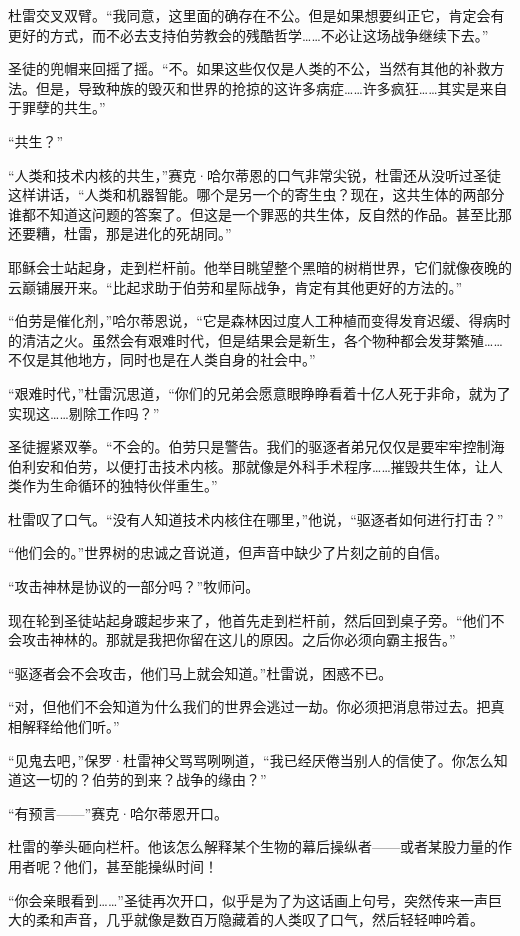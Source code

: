 \documentclass[AutoFakeBold=true]{book}
\begin{document}
杜雷交叉双臂。``我同意，这里面的确存在不公。但是如果想要纠正它，肯定会有更好的方式，而不必去支持伯劳教会的残酷哲学……不必让这场战争继续下去。''

圣徒的兜帽来回摇了摇。``不。如果这些仅仅是人类的不公，当然有其他的补救方法。但是，导致种族的毁灭和世界的抢掠的这许多病症……许多疯狂……其实是来自于罪孽的共生。''

``共生？''

``人类和技术内核的共生，''赛克·哈尔蒂恩的口气非常尖锐，杜雷还从没听过圣徒这样讲话，``人类和机器智能。哪个是另一个的寄生虫？现在，这共生体的两部分谁都不知道这问题的答案了。但这是一个罪恶的共生体，反自然的作品。甚至比那还要糟，杜雷，那是进化的死胡同。''

耶稣会士站起身，走到栏杆前。他举目眺望整个黑暗的树梢世界，它们就像夜晚的云巅铺展开来。``比起求助于伯劳和星际战争，肯定有其他更好的方法的。''

``伯劳是催化剂，''哈尔蒂恩说，``它是森林因过度人工种植而变得发育迟缓、得病时的清洁之火。虽然会有艰难时代，但是结果会是新生，各个物种都会发芽繁殖……不仅是其他地方，同时也是在人类自身的社会中。''

``艰难时代，''杜雷沉思道，``你们的兄弟会愿意眼睁睁看着十亿人死于非命，就为了实现这……剔除工作吗？''

圣徒握紧双拳。``不会的。伯劳只是警告。我们的驱逐者弟兄仅仅是要牢牢控制海伯利安和伯劳，以便打击技术内核。那就像是外科手术程序……摧毁共生体，让人类作为生命循环的独特伙伴重生。''

杜雷叹了口气。``没有人知道技术内核住在哪里，''他说，``驱逐者如何进行打击？''

``他们会的。''世界树的忠诚之音说道，但声音中缺少了片刻之前的自信。

``攻击神林是协议的一部分吗？''牧师问。

现在轮到圣徒站起身踱起步来了，他首先走到栏杆前，然后回到桌子旁。``他们不会攻击神林的。那就是我把你留在这儿的原因。之后你必须向霸主报告。''

``驱逐者会不会攻击，他们马上就会知道。''杜雷说，困惑不已。

``对，但他们不会知道为什么我们的世界会逃过一劫。你必须把消息带过去。把真相解释给他们听。''

``见鬼去吧，''保罗·杜雷神父骂骂咧咧道，``我已经厌倦当别人的信使了。你怎么知道这一切的？伯劳的到来？战争的缘由？''

``有预言——''赛克·哈尔蒂恩开口。

杜雷的拳头砸向栏杆。他该怎么解释某个生物的幕后操纵者——或者某股力量的作用者呢？他们，甚至能操纵时间！

``你会亲眼看到……''圣徒再次开口，似乎是为了为这话画上句号，突然传来一声巨大的柔和声音，几乎就像是数百万隐藏着的人类叹了口气，然后轻轻呻吟着。
\end{document}
